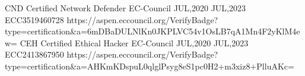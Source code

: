 
\begin{cvcerts}

  \cvcert
    {CND} %
    {Certified Network Defender} %
    {EC-Council} %
    {JUL,2020} %
    {JUL,2023} %
    {ECC3519460728} %
    {https://aspen.eccouncil.org/VerifyBadge?type=certification&a=6mDBaDULNlKn0JKPLVC54v1OsLB7qA1Mn4F2yKlM4ew=} %
  \cvcert
    {CEH} %
    {Certified Ethical Hacker} %
    {EC-Council} %
    {JUL,2020} %
    {JUL,2023} %
    {ECC2413867950} %
    {https://aspen.eccouncil.org/VerifyBadge?type=certification&a=AHKmKDspuL0qlglPsyg8eS1pc0H2+m3xiz8+PlluAKc=} %

\end{cvcerts}